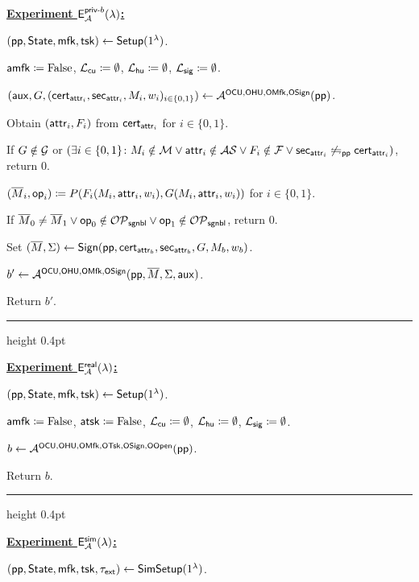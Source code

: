 \begin{experiment}

\underline{\textbf{Experiment $\mathsf{E}^{\mathsf{priv}\textsf{-}b}_{\mathcal{A}}(\lambda)$:}}

$(\mathsf{pp}, \mathsf{State}, \mathsf{mfk}, \mathsf{tsk}) \gets \mathsf{Setup}(1^\lambda)$.

$\mathsf{amfk} \coloneqq \mathrm{False}$,
$\mathcal{L}_\mathsf{cu} \coloneqq \emptyset$,
$\mathcal{L}_\mathsf{hu} \coloneqq \emptyset$,
$\mathcal{L}_\mathsf{sig} \coloneqq \emptyset$.

$(\mathsf{aux}, G, (\mathsf{cert}_{\mathsf{attr}_i}, \mathsf{sec}_{\mathsf{attr}_i}, M_i, w_i)_{i \in \{0, 1\}})
\gets \mathcal{A}^{\mathsf{OCU}, \mathsf{OHU}, \mathsf{OMfk}, \mathsf{OSign}}(\mathsf{pp})$.

Obtain $(\mathsf{attr}_i, F_i)$ from $\mathsf{cert}_{\mathsf{attr}_i}$ for $i \in \{0, 1\}$.

If $G \notin \mathcal{G}$ or $(\exists i \in \{0, 1\} \colon M_i \notin \mathcal{M} \lor \mathsf{attr}_i \notin \mathcal{AS}
\lor F_i \notin \mathcal{F}
\lor \mathsf{sec}_{\mathsf{attr}_i} \not\leftrightharpoons_{\mathsf{pp}} \mathsf{cert}_{\mathsf{attr}_i})$,
return $0$.

$(\overline{M}_i, \mathsf{op}_i) \coloneqq P(F_i(M_i, \mathsf{attr}_i, w_i), G(M_i, \mathsf{attr}_i, w_i))$
for $i \in \{0, 1\}$.

If $\overline{M}_0 \neq \overline{M}_1
\lor \mathsf{op}_0 \notin \mathcal{OP}_\mathsf{sgnbl}
\lor \mathsf{op}_1 \notin \mathcal{OP}_\mathsf{sgnbl}$,
return $0$.

Set $(\overline{M}, \Sigma) \gets \mathsf{Sign}(\mathsf{pp}, \mathsf{cert}_{\mathsf{attr}_b}, \mathsf{sec}_{\mathsf{attr}_b}, G, M_b, w_b)$.

$b' \gets \mathcal{A}^{\mathsf{OCU}, \mathsf{OHU}, \mathsf{OMfk}, \mathsf{OSign}}(\mathsf{pp}, \overline{M}, \Sigma, \mathsf{aux})$.

Return $b'$.

\vspace{1ex}
\hrule height 0.4pt
  
\medskip
\underline{\textbf{Experiment $\mathsf{E}^{\mathsf{real}}_{\mathcal{A}}(\lambda)$:}}

$(\mathsf{pp}, \mathsf{State}, \mathsf{mfk}, \mathsf{tsk}) \gets \mathsf{Setup}(1^\lambda)$.

$\mathsf{amfk} \coloneqq \mathrm{False}$, $\mathsf{atsk} \coloneqq \mathrm{False}$,
$\mathcal{L}_\mathsf{cu} \coloneqq \emptyset$, $\mathcal{L}_\mathsf{hu} \coloneqq \emptyset$, $\mathcal{L}_\mathsf{sig} \coloneqq \emptyset$.

$b \gets \mathcal{A}^{\mathsf{OCU}, \mathsf{OHU}, \mathsf{OMfk}, \mathsf{OTsk}, \mathsf{OSign}, \mathsf{OOpen}}(\mathsf{pp})$.

Return $b$.

\vspace{1ex}
\hrule height 0.4pt

\medskip
\underline{\textbf{Experiment $\mathsf{E}^{\mathsf{sim}}_{\mathcal{A}}(\lambda)$:}}

$(\mathsf{pp}, \mathsf{State}, \mathsf{mfk}, \mathsf{tsk}, \tau_\mathsf{ext}) \gets \mathsf{SimSetup}(1^\lambda)$.


\end{experiment}
